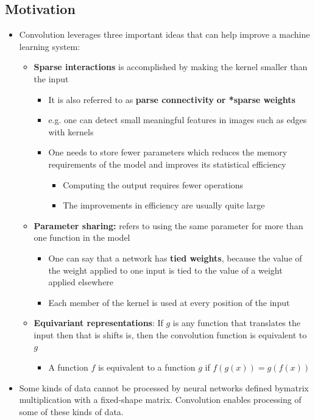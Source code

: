 \documentclass[11pt]{article}
\begin{document}
\subsection{Motivation}
\label{sec:org8a4dc26}
\begin{itemize}
\item Convolution leverages three important ideas that can help improve a machine learning system:
\begin{itemize}
\item \textbf{Sparse interactions} is accomplished by making the kernel smaller than the input
\begin{itemize}
\item It is also referred to as \textbf{parse connectivity} \textbf{or *sparse weights}
\item e.g. one can detect small meaningful features in images such as edges with kernels
\item One needs to store fewer parameters which reduces the memory requirements of the model and improves its statistical efficiency
\begin{itemize}
\item Computing the output requires fewer operations
\item The improvements in efficiency are usually quite large
\end{itemize}
\end{itemize}

\item \textbf{Parameter sharing:} refers to using the same parameter for more than one function in the model
\begin{itemize}
\item One can say that a network has \textbf{tied weights}, because the value of the weight applied to one input is tied to the value of a weight applied elsewhere
\item Each member of the kernel is used at every position of the input
\end{itemize}

\item \textbf{Equivariant representations}: If \(g\) is any function that translates the input then that is shifts is, then the convolution function is equivalent to \(g\) 
\begin{itemize}
\item A function \(f\) is equivalent to a function \(g\) if \(f(g(x))=g(f(x))\)
\end{itemize}
\end{itemize}

\item Some kinds of data cannot be processed by neural networks deﬁned bymatrix multiplication with a ﬁxed-shape matrix. Convolution enables processing of some of these kinds of data.
\end{itemize}
\end{document}
